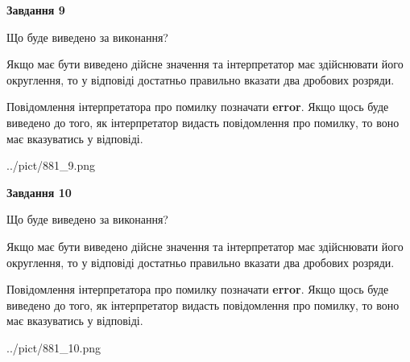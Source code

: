 \documentclass[12pt, ukrainian]{article}
\begin{document}
{\begin {Large}
{\begin {center}\textbf{Завдання 9}\end {center}}\par
Що буде виведено за виконання? \par

Якщо має бути виведено дійсне значення та інтерпретатор має здійснювати його округлення, 
то у відповіді достатньо правильно вказати два дробових розряди.

Повідомлення інтерпретатора про помилку позначати \textbf{error}.
Якщо щось буде виведено до того, як інтерпретатор видасть повідомлення про помилку, 
то воно має вказуватись у відповіді. \par

\begin{center}
	{../pict/881_9.png}
\end{center}
\newpage

{\begin {center}\textbf{Завдання 10}\end {center}}\par
Що буде виведено за виконання? \par

Якщо має бути виведено дійсне значення та інтерпретатор має здійснювати його округлення, 
то у відповіді достатньо правильно вказати два дробових розряди.

Повідомлення інтерпретатора про помилку позначати \textbf{error}.
Якщо щось буде виведено до того, як інтерпретатор видасть повідомлення про помилку, 
то воно має вказуватись у відповіді. \par

\begin{center}
	{../pict/881_10.png}
\end{center}
\newpage

\end {Large}}
\end{document}
